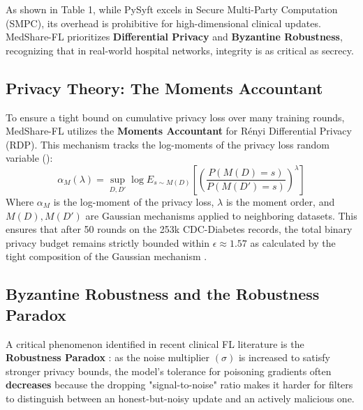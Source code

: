 \documentclass[10pt, a4paper, twocolumn]{article}
\begin{document}
\begin{table}[hbt!]
\centering
{}
\caption{Framework Comparison showing MedShare-FL's focus on clinical integrity.}
\end{table}

As shown in Table 1, while PySyft excels in Secure Multi-Party Computation (SMPC), its overhead is prohibitive for high-dimensional clinical updates. MedShare-FL prioritizes \textbf{Differential Privacy} and \textbf{Byzantine Robustness}, recognizing that in real-world hospital networks, integrity is as critical as secrecy.

\subsection{Privacy Theory: The Moments Accountant}
To ensure a tight bound on cumulative privacy loss over many training rounds, MedShare-FL utilizes the \textbf{Moments Accountant} for Rényi Differential Privacy (RDP). This mechanism tracks the log-moments of the privacy loss random variable (\cite{abadi2016}):
\begin{equation}
    \alpha_M(\lambda) = \sup_{D, D'} \log E_{s \sim M(D)} [ (\frac{P(M(D)=s)}{P(M(D')=s)})^{\lambda} ]
\end{equation}
Where $\alpha_M$ is the log-moment of the privacy loss, $\lambda$ is the moment order, and $M(D), M(D')$ are Gaussian mechanisms applied to neighboring datasets. This ensures that after 50 rounds on the 253k CDC-Diabetes records, the total binary privacy budget remains strictly bounded within $\epsilon \approx 1.57$ as calculated by the tight composition of the Gaussian mechanism \cite{abadi2016}.

\subsection{Byzantine Robustness and the Robustness Paradox}
A critical phenomenon identified in recent clinical FL literature is the \textbf{Robustness Paradox} \cite{bagdasaryan2020}: as the noise multiplier $(\sigma)$ is increased to satisfy stronger privacy bounds, the model's tolerance for poisoning gradients often \textbf{decreases} because the dropping "signal-to-noise" ratio makes it harder for filters to distinguish between an honest-but-noisy update and an actively malicious one. 
\end{document}

